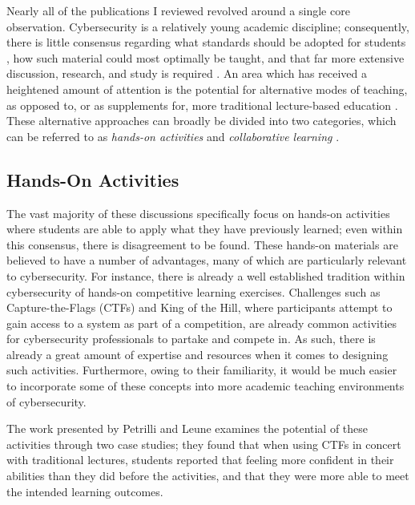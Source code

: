     Nearly all of the publications I reviewed revolved around a single core observation. %
Cybersecurity is a relatively young academic discipline; %
consequently, there is little consensus regarding what standards should be adopted for students \cite{R-Raj}, how such material could most optimally be taught, and that far more extensive discussion, research, and study is required \cite{Z-Zeng}. %
An area which has received a heightened amount of attention is the potential for alternative modes of teaching, as opposed to, or as supplements for, more traditional lecture-based education \cite{Z-Zeng,N-Eliot,E-Gavas,C-Herr,K-Chung, C-Kussmaul,K-Leune,B-Payne,L-Thomas}. %
These alternative approaches can broadly be divided into two categories, which can be referred to as \emph{hands-on activities} and \emph{collaborative learning} \cite{P-Deshpande,C-Kussmaul,B-Payne}.

\subsection{Hands-On Activities}

    The vast majority of these discussions specifically focus on hands-on activities where students are able to apply what they have previously learned; %
even within this consensus, there is disagreement to be found. %
These hands-on materials are believed to have a number of advantages, many of which are particularly relevant to cybersecurity. %
For instance, there is already a well established tradition within cybersecurity of hands-on competitive learning exercises. %
Challenges such as Capture-the-Flags (CTFs) and King of the Hill, where participants attempt to gain access to a system as part of a competition, are already common activities for cybersecurity professionals to partake and compete in. %
As such, there is already a great amount of expertise and resources when it comes to designing such activities. %
Furthermore, owing to their familiarity, it would be much easier to incorporate some of these concepts into more academic teaching environments of cybersecurity.

    The work presented by Petrilli and Leune examines the potential of these activities through two case studies; %
they found that when using CTFs in concert with traditional lectures, students reported that feeling more confident in their abilities than they did before the activities, and that they were more able to meet the intended learning outcomes. 

